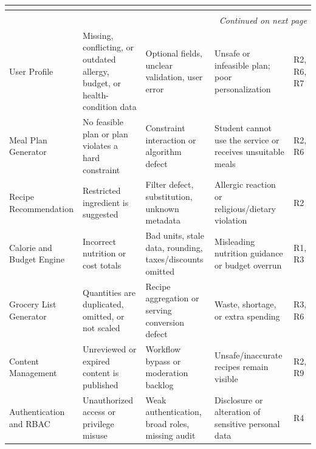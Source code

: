 \documentclass[11pt,a4paper]{article}
\renewcommand{\arraystretch}{1.15}
\begin{document}
\begin{landscape}
\begin{center}
\scriptsize
\setlength{\tabcolsep}{2.5pt}
\renewcommand{\arraystretch}{1.18}
\begin{longtable}{|p{4.0cm}|p{5.2cm}|p{5.0cm}|p{7.0cm}|p{1.4cm}|}
\hline
\rowcolor{headerblue} \textbf{\color{white}{Component}} & \textbf{\color{white}{Failure mode}} & \textbf{\color{white}{Possible causes}} & \textbf{\color{white}{Consequences}} & \textbf{\color{white}{Risk IDs}} \\ \hline
\endfirsthead
\hline
\rowcolor{headerblue} \textbf{\color{white}{Component}} & \textbf{\color{white}{Failure mode}} & \textbf{\color{white}{Possible causes}} & \textbf{\color{white}{Consequences}} & \textbf{\color{white}{Risk IDs}} \\ \hline
\endhead
\hline
\multicolumn{5}{r}{\small\itshape Continued on next page}\\
\endfoot
\hline
\endlastfoot
User Profile & Missing, conflicting, or outdated allergy, budget, or health-condition data & Optional fields, unclear validation, user error & Unsafe or infeasible plan; poor personalization & R2, R6, R7 \\ \hline
Meal Plan Generator & No feasible plan or plan violates a hard constraint & Constraint interaction or algorithm defect & Student cannot use the service or receives unsuitable meals & R2, R6 \\ \hline
Recipe Recommendation & Restricted ingredient is suggested & Filter defect, substitution, unknown metadata & Allergic reaction or religious/dietary violation & R2 \\ \hline
Calorie and Budget Engine & Incorrect nutrition or cost totals & Bad units, stale data, rounding, taxes/discounts omitted & Misleading nutrition guidance or budget overrun & R1, R3 \\ \hline
Grocery List Generator & Quantities are duplicated, omitted, or not scaled & Recipe aggregation or serving conversion defect & Waste, shortage, or extra spending & R3, R6 \\ \hline
Content Management & Unreviewed or expired content is published & Workflow bypass or moderation backlog & Unsafe/inaccurate recipes remain visible & R2, R9 \\ \hline
Authentication and RBAC & Unauthorized access or privilege misuse & Weak authentication, broad roles, missing audit & Disclosure or alteration of sensitive personal data & R4 \\ \hline

\end{longtable}
\end{center}
\end{landscape}
\end{document}
